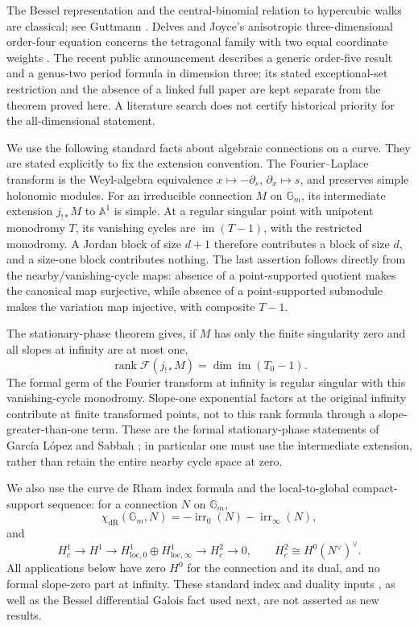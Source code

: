 \documentclass[11pt,a4paper]{article}
\theoremstyle{definition}
\theoremstyle{remark}
\numberwithin{equation}{section}
\begin{document}
The Bessel representation and the central-binomial relation to
hypercubic walks are classical; see Guttmann \cite{p5:BG_Guttmann2010}.
Delves and Joyce's anisotropic three-dimensional order-four equation
concerns the tetragonal family with two equal coordinate weights
\cite{p5:BG_DelvesJoyce2001}.  The recent public announcement
\cite{p5:BG_WatsonAnnouncement} describes a generic order-five result
and a genus-two period formula in dimension three; its stated
exceptional-set restriction and the absence of a linked full paper
are kept separate from the theorem proved here.  A literature
search does not certify historical priority for the all-dimensional
statement.

We use the following standard facts about algebraic connections on
a curve.  They are stated explicitly to fix the extension convention.
The Fourier--Laplace transform is the Weyl-algebra equivalence
$x\mapsto-\partial_s$, $\partial_x\mapsto s$, and preserves simple
holonomic modules.  For an irreducible connection $M$ on
$\mathbb G_m$, its intermediate extension $j_{!*}M$ to
$\mathbb A^1$ is simple.  At a regular singular point with unipotent
monodromy $T$, its vanishing cycles are $\operatorname{im}(T-1)$,
with the restricted monodromy.  A Jordan block of size $d+1$
therefore contributes a block of size $d$, and a size-one block
contributes nothing.  The last assertion follows directly from the
nearby/vanishing-cycle maps: absence of a point-supported quotient
makes the canonical map surjective, while absence of a point-supported
submodule makes the variation map injective, with composite $T-1$.

The stationary-phase theorem gives, if $M$ has only the finite
singularity zero and all slopes at infinity are at most one,
\begin{equation}\label{p5:bg:Fourierfact}
 \operatorname{rank}\mathcal F(j_{!*}M)
       =\dim\operatorname{im}(T_0-1).
\end{equation}
The formal germ of the Fourier transform at infinity is regular
singular with this vanishing-cycle monodromy.  Slope-one exponential
factors at the original infinity contribute at finite transformed
points, not to this rank formula through a slope-greater-than-one
term.  These are the formal stationary-phase statements of
Garc\'ia L\'opez and Sabbah
\cite{p5:BG_GarciaLopez2004,p5:BG_Sabbah2008}; in particular one must use
the intermediate extension, rather than retain the entire nearby
cycle space at zero.

We also use the curve de Rham index formula and the local-to-global
compact-support sequence: for a connection $N$ on $\mathbb G_m$,
\[
 \chi_{\mathrm{dR}}(\mathbb G_m,N)
             =-\operatorname{irr}_0(N)-\operatorname{irr}_\infty(N),
\]
and
\[
 H_c^1\longrightarrow H^1\longrightarrow
 H^1_{\mathrm{loc},0}\oplus H^1_{\mathrm{loc},\infty}
                   \longrightarrow H_c^2\longrightarrow0,
 \qquad H_c^2\cong H^0(N^\vee)^\vee.
\]
All applications below have zero $H^0$ for the connection and its
dual, and no formal slope-zero part at infinity.  These standard
index and duality inputs \cite{p5:BG_Malgrange1991}, as well as the Bessel differential Galois
fact used next, are not asserted as new results.
\end{document}
